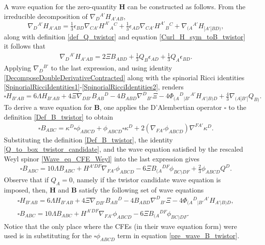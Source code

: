 \documentclass[10pt,a4paper]{article}
\theoremstyle{plain}
\def\bmB{{\bm B}}
\def\bmH{{\bm H}}
\begin{document}
A wave equation for the zero-quantity $\bmH$ can be constructed as
follows.  From the irreducible decomposition of
$\nabla_D{}^{A'}H_{A'AB}$,
\[
\nabla_{D}{}^{A'}H_{A'AB} = \tfrac{1}{3} \epsilon _{BD}
\nabla_{CA'}H^{A'}{}_{A}{}^{C} + \tfrac{1}{3} \epsilon _{AD}
\nabla_{CA'}H^{A'}{}_{B}{}^{C} + \nabla_{(A}{}^{A'}H_{|A'|BD)},
\]
 along with definition \eqref{def_Q_twistor} and equation
\eqref{Curl_H_sym_toB_twistor} it follows that
\begin{align}\label{derH_twistor_toBandQ}
\nabla_{D}{}^{A'}H_{A'AB} = 2 \Xi B_{ABD}  + \tfrac{1}{3} Q_{B}
\epsilon _{AD} + \tfrac{1}{3} Q_{A} \epsilon _{BD}.
\end{align}
Applying $\nabla_{D}{}^{B'}$ to the last expression, and using
identity \eqref{DecomposeDoubleDerivativeContracted} along with the
spinorial Ricci identities
\eqref{SpinorialRicciIdentities1}-\eqref{SpinorialRicciIdentities2},
renders
\begin{equation}\label{wave_H_twistor}
  \square H_{B'AB} = 6 \Lambda H_{B'AB} + 4 \Xi
  \nabla_{DB'}B_{AB}{}^{D} -4 B_{ABD} \nabla^{D}{}_{B'}\Xi -4
  \Phi_{(A}{}^{D}{}_{|B'}{}^{A'}H_{A'|B)D} + \tfrac{4}{3}
  \nabla_{(A|B'|}Q_{B)}.
\end{equation}
To derive a wave equation for $\bmB$, one applies the D'Alembertian
operator $\square$ to the definition \eqref{Def_B_twistor} to obtain
\begin{align}\label{pre_wave_B_twistor}
\square B_{ABC} = \kappa ^{D} \square \phi _{ABCD} + \phi _{ABCD}
\square \kappa ^{D} + 2 (\nabla_{FA'}\phi _{ABCD}) \nabla^{FA'}\kappa
^{D}.
\end{align}
Substituting the definition \eqref{Def_B_twistor}, the identity
\eqref{Q_to_box_twistor_candidate}, and the wave equation satisfied by
the rescaled Weyl spinor \eqref{Wave_eq_CFE_Weyl} into the last
expression gives
\begin{equation}\label{wave_B_twistor}
\square B_{ABC} = 10 \Lambda B_{ABC} + H^{A'DF} \nabla_{FA'}\phi
_{ABCD} -6 \Xi B_{(A}{}^{DF}\phi _{BC)DF} + \tfrac{2}{3} \phi _{ABCD}
Q^{D}.
\end{equation}
Observe that if $Q_{A}=0$, namely if the twistor candidate wave
equation is imposed, then, $\bmH$ and $\bmB$ satisfy the following set
of wave equations
\begin{subequations}
\begin{eqnarray}
  && \square H_{B'AB} = 6 \Lambda H_{B'AB} + 4 \Xi
  \nabla_{DB'}B_{AB}{}^{D}  -4 B_{ABD} \nabla^{D}{}_{B'}\Xi   -4 \Phi_{(A}{}^{D}{}_{|B'}{}^{A'}H_{A'|B)D},\qquad
   \label{Hom_wave_HandB1} \\
 && \square B_{ABC} = 10\Lambda B_{ABC} + H^{A'DF} \nabla_{FA'}\phi _{ABCD}  -6 \Xi B_{(A}{}^{DF}\phi
_{BC)DF}.  \label{Hom_wave_HandB2}
\end{eqnarray}
\end{subequations}
Notice that the only place where the CFEs (in their wave equation
form) were used is in substituting for the $\square \phi _{ABCD}$ term
in equation \eqref{pre_wave_B_twistor}.  \\
\end{document}
